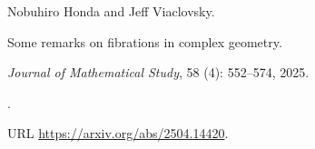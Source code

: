 Nobuhiro Honda and Jeff Viaclovsky.

\newblock Some remarks on fibrations in complex geometry.

\newblock \emph{Journal of Mathematical Study}, 58 (4):
  552--574, 2025.

\newblock {}.

\newblock URL \url{https://arxiv.org/abs/2504.14420}.

